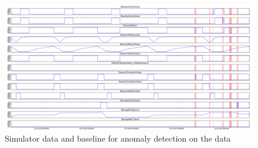 \documentclass[english, a4paper]{report}
\begin{document}
{{{{                \begin{figure}[H]
                    \centering \includegraphics[width=\textwidth]{BaselineSimulatorData}
                    \caption{Simulator data and baseline for anomaly detection on the data} \label{fig:baselineSimAnomalies}
                \end{figure}
            }
            
}}}
\end{document}
